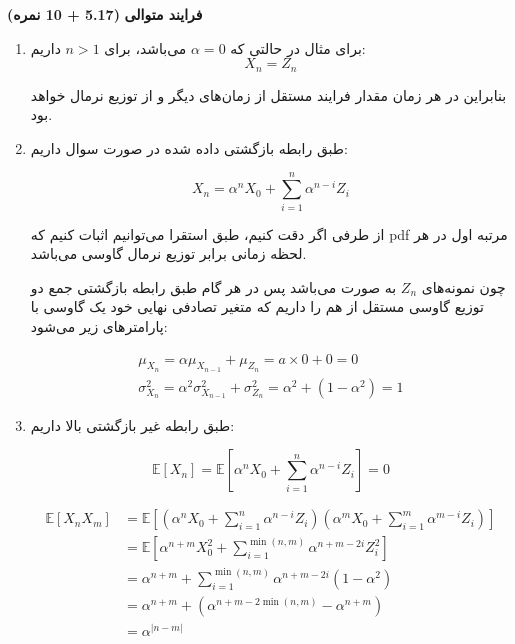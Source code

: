 \Large \textbf{فرایند متوالی}
\large \textbf{(5.17 + 10 نمره)}

\normalsize \vspace{0.5cm}
\begin{enumerate}
	\item
	برای مثال در حالتی که
	$\alpha = 0$
	می‌باشد،‌ برای
	$n > 1$
	داریم:
	$$
	{X_n} = {Z_n}
	$$
	
	بنابراین در هر زمان مقدار فرایند مستقل از زمان‌های دیگر و از توزیع نرمال خواهد بود.
	
	\item
	طبق رابطه بازگشتی داده شده در صورت سوال داریم:
	
	$$
	{X_n} = {\alpha ^n}{X_0} + \sum\limits_{i = 1}^n {{\alpha ^{n - i}}{Z_i}}
	$$
	
	از طرفی اگر دقت کنیم،‌ طبق استقرا می‌توانیم اثبات کنیم که pdf مرتبه اول در هر لحظه زمانی برابر توزیع نرمال گاوسی می‌باشد.
	
	چون نمونه‌های
	${Z_n}$
	به صورت
	می‌باشد پس در هر گام طبق رابطه بازگشتی جمع دو توزیع گاوسی مستقل از هم را داریم که متغیر تصادفی نهایی خود یک گاوسی با پارامتر‌های زیر می‌شود:
	
	$$
	\begin{array}{l}
		{\mu _{{X_n}}} = \alpha {\mu _{{X_{n - 1}}}} + {\mu _{{Z_n}}} = a \times 0 + 0 = 0\\
		\sigma _{{X_n}}^2 = {\alpha ^2}\sigma _{{X_{n - 1}}}^2 + \sigma _{{Z_n}}^2 = {\alpha ^2} + \left( {1 - {\alpha ^2}} \right) = 1
	\end{array}
	$$
	
	\item
	
	طبق رابطه غیر بازگشتی بالا داریم:
	
	$$
	\mathbb{E}\left[ {{X_n}} \right] = \mathbb{E}\left[ {{\alpha ^n}{X_0} + \sum\limits_{i = 1}^n {{\alpha ^{n - i}}{Z_i}} } \right] = 0
	$$
	
	$$
	\begin{aligned}
		\mathbb{E}\left[ {{X_n}{X_m}} \right] & = \mathbb{E}\left[ {\left( {{\alpha ^n}{X_0} + \sum\limits_{i = 1}^n {{\alpha ^{n - i}}{Z_i}} } \right)\left( {{\alpha ^m}{X_0} + \sum\limits_{i = 1}^m {{\alpha ^{m - i}}{Z_i}} } \right)} \right]\\
		& = \mathbb{E}\left[ {{\alpha ^{n + m}}X_0^2 + \sum\limits_{i = 1}^{\min (n,m)} {{\alpha ^{n + m - 2i}}Z_i^2} } \right]\\
		& = {\alpha ^{n + m}} + \sum\limits_{i = 1}^{\min (n,m)} {{\alpha ^{n + m - 2i}}\left( {1 - {\alpha ^2}} \right)} \\
		& ‌= {\alpha ^{n + m}} + \left( {{\alpha ^{n + m - 2\min \left( {n,m} \right)}} - {\alpha ^{n + m}}} \right)\\
		&‌= {\alpha ^{\left| {n - m} \right|}}
	\end{aligned}
	$$
	

\end{enumerate}
